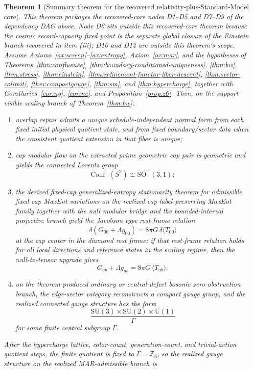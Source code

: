 \documentclass[11pt]{article}
\newtheorem{theorem}{Theorem}[section]
\newcommand{\SU}{\mathrm{SU}}
\newcommand{\U}{\mathrm{U}}
\newcommand{\Conf}{\mathrm{Conf}}
\begin{document}
\begin{theorem}[Summary theorem for the recovered relativity-plus-Standard-Model core]\label{thm:master}
This theorem packages the recovered-core nodes D1--D5 and D7--D9 of the dependency DAG above. Node D6 sits outside this recovered-core theorem because the cosmic record-capacity fixed point is the separate global closure of the Einstein branch recovered in item (iii); D10 and D12 are outside this theorem's scope. Assume Axioms~\ref{ax:screen}--\ref{ax:entropy}, Axiom~\ref{ax:mar}, and the hypotheses of Theorems~\ref{thm:confluence}, \ref{thm:boundary-conditioned-uniqueness}, \ref{thm:bw}, \ref{thm:stress}, \ref{thm:einstein}, \ref{thm:refinement-functor-fiber-descent}, \ref{thm:sector-colimit}, \ref{thm:compactgauge}, \ref{thm:sm}, and \ref{thm:hypercharge}, together with Corollaries~\ref{cor:ng}, \ref{cor:nc}, and Proposition~\ref{prop:z6}. Then, on the support-visible scaling branch of Theorem~\ref{thm:bw}:
\begin{enumerate}[label=(\roman*),leftmargin=2em]
\item overlap repair admits a unique schedule-independent normal form from each fixed initial
physical quotient state, and from fixed boundary/sector data when the consistent quotient
extension in that fiber is unique;
\item cap modular flow on the extracted prime geometric cap pair is geometric and yields the connected Lorentz group
\[
\Conf^+(S^2)\cong \mathrm{SO}^+(3,1);
\]
\item the derived fixed-cap generalized-entropy stationarity theorem for admissible fixed-cap MaxEnt variations on the realized cap-label-preserving MaxEnt family together with the null modular bridge and the bounded-interval projective branch yield the Jacobson-type rest-frame relation
\[
\delta\!\left(G_{00}+\Lambda g_{00}\right)=8\pi G\,\delta\langle T_{00}\rangle
\]
at the cap center in the diamond rest frame; if that rest-frame relation holds for all local directions and reference states in the scaling regime, then the null-to-tensor upgrade gives
\[
G_{ab}+\Lambda g_{ab}=8\pi G\,\langle T_{ab}\rangle;
\]
\item on the theorem-produced ordinary or central-defect bosonic zero-obstruction branch, the edge-sector category reconstructs a compact gauge group, and the realized connected gauge structure has the form
\[
\frac{\SU(3)\times\SU(2)\times\U(1)}{\Gamma}
\]
for some finite central subgroup \(\Gamma\).
\end{enumerate}
After the hypercharge lattice, color-count, generation-count, and trivial-action quotient steps, the finite quotient is fixed to \(\Gamma=\mathbb Z_6\), so the realized gauge structure on the realized MAR-admissible branch is

\end{theorem}
\end{document}
